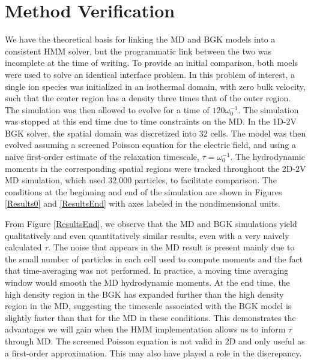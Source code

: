 \documentclass{article}
\begin{document}

\section{Method Verification}

We have the theoretical basis for linking the MD and BGK models into a consistent HMM solver, but the programmatic link between the two was incomplete at the time of writing. To provide an initial comparison, both moels were used to solve an identical interface problem. In this problem of interest, a single ion species was initialized in an isothermal domain, with zero bulk velocity, such that the center region has a density three times that of the outer region. The simulation was then allowed to evolve for a time of $120\omega_0^{-1}$. The simulation was stopped at this end time due to time constraints on the MD. In the 1D-2V BGK solver, the spatial domain was discretized into 32 cells. The model was then evolved assuming a screened Poisson equation for the electric field, and using a naive first-order estimate of the relaxation timescale, $\tau = \omega_0^{-1}$. The hydrodynamic moments in the corresponding spatial regions were tracked throughout the 2D-2V MD simulation, which used 32,000 particles, to facilitate comparison. The conditions at the beginning and end of the simulation are shown in Figures \ref{Results0} and \ref{ResultsEnd} with axes labeled in the nondimensional units.

From Figure \ref{ResultsEnd}, we observe that the MD and BGK simulations yield qualitatively and even quantitatively similar results, even with a very naively calculated $\tau$. The noise that appears in the MD result is present mainly due to the small number of particles in each cell used to compute moments and the fact that time-averaging was not performed. In practice, a moving time averaging window would smooth the MD hydrodynamic moments. At the end time, the high density region in the BGK has expanded further than the high density region in the MD, suggesting the timescale associated with the BGK model is slightly faster than that for the MD in these conditions. This demonstrates the advantages we will gain when the HMM implementation allows us to inform $\tau$ through MD. The screened Poisson equation is not valid in 2D and only useful as a first-order approximation. This may also have played a role in the discrepancy. 
\end{document}
